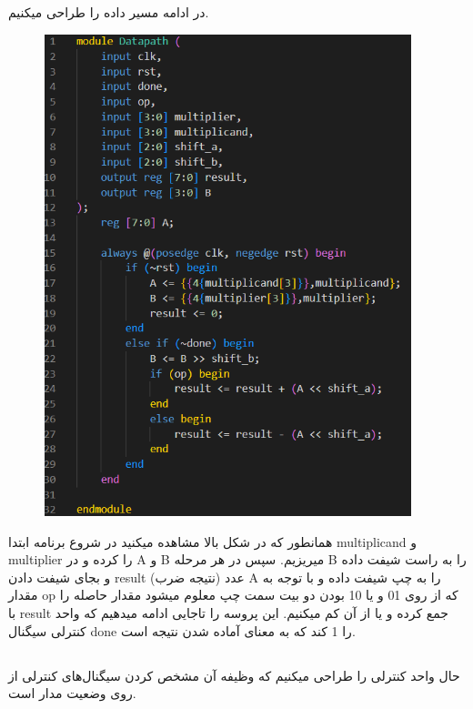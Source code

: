\documentclass{article}
\begin{document}
در ادامه مسیر داده را طراحی میکنیم.
\begin{figure}[H]
    \centering
    \includegraphics[width=0.95\textwidth]{DP.png}
\end{figure}
همانطور که در شکل بالا مشاهده میکنید در شروع برنامه ابتدا 
multiplicand 
و
multiplier
را 
کرده و در 
A
و
B
میریزیم.
سپس در هر مرحله 
B
را به راست شیفت داده و بجای شیفت دادن 
result
(نتیجه ضرب)
عدد 
A
را به چپ شیفت داده و با توجه به مقدار
op
که از روی 
01 و یا 10 بودن
دو بیت سمت چپ معلوم میشود مقدار حاصله را با 
result
جمع کرده و یا از آن کم میکنیم.
این پروسه را تاجایی ادامه میدهیم که واحد کنترلی سیگنال 
done 
را 1 کند که به معنای آماده شدن نتیجه است.

\newpage
\subsection{}

حال واحد کنترلی را طراحی میکنیم که وظیفه آن مشخص کردن سیگنال‌های 
کنترلی از روی وضعیت مدار است.
\end{document}
